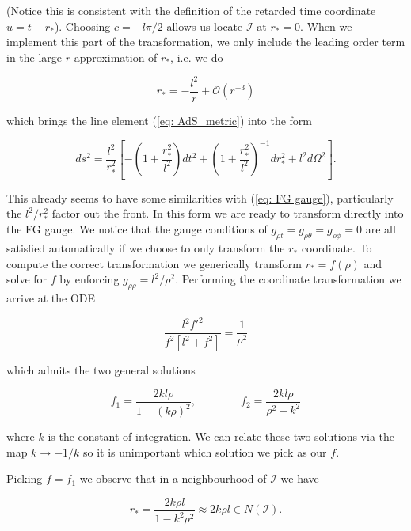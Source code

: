 \documentclass[a4paper,11pt]{article}
\numberwithin{equation}{section}
\begin{document}
\noindent (Notice this is consistent with the definition of the retarded time coordinate $u=t-r_{*}$). Choosing $c=-l\pi/2$ allows us locate $\mathscr{I}$ at $r_*=0$.  When we implement this part of the transformation, we only include the leading order term in the large $r$ approximation of $r_*$, i.e. we do 

\begin{equation} \label{eq: leading_order_tortoise}
r_*=-\frac{l^2}{r}+\mathcal{O}(r^{-3})
\end{equation}

\noindent which brings the line element (\ref{eq: AdS_metric}) into the form 

\begin{equation} \label{eq: tortoise_AdS_metric}
ds^2=\frac{l^2}{r_{*}^2}\left[-\left(1+\frac{r_{*}^2}{l^2}\right)dt^2+\left(1+\frac{r_{*}^2}{l^2}\right)^{-1}dr_*^2+l^2d\Omega^2\right].
\end{equation}

\noindent This already seems to have some similarities with (\ref{eq: FG gauge}), particularly the $l^2/r_*^2$ factor out the front. In this form we are ready to transform directly into the FG gauge. We notice that the gauge conditions of $g_{\rho t}=g_{\rho \theta}=g_{\rho \phi}=0$ are all satisfied automatically if we choose to only transform the $r_{*}$ coordinate. To compute the correct transformation we generically transform $r_{*}=f(\rho)$ and solve for $f$ by enforcing $g_{\rho \rho}=l^2/\rho^2$. Performing the coordinate transformation we arrive at the ODE

\begin{equation} \label{eq: FG_ODE}
\frac{l^2 f'^2}{f^2 [l^2+f^2]}=\frac{1}{\rho^2}
\end{equation}

\noindent which admits the two general solutions 

\begin{equation}
f_1=\frac{2k l \rho}{1-(k\rho)^2}, \qquad \qquad f_2=\frac{2kl\rho}{\rho^2-k^2}
\end{equation}

\noindent where $k$ is the constant of integration. We can relate these two solutions via the map $k \rightarrow -1/k$ so it is unimportant which solution we pick as our $f$. \par 

Picking $f=f_1$ we observe that in a neighbourhood of $\mathscr{I}$ we have 

\begin{equation} \label{eq: tortoise_nbhd}
r_*=\frac{2 k \rho l}{1-k^2 \rho^2}\approx 2k\rho l \in N(\mathscr{I}).
\end{equation}
\end{document}
